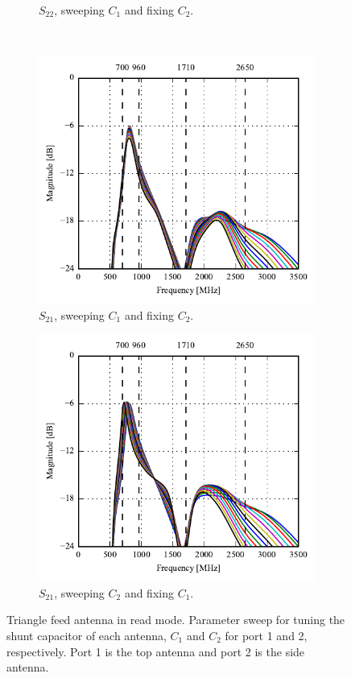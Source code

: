 \begin{figure}[htbp]
\begin{subfigure}[b]{0.49\linewidth}
        \caption{$S_{22}$, sweeping $C_1$ and fixing $C_2$.}
    \end{subfigure}
    \\
    \begin{subfigure}[b]{0.49\linewidth}
        \centering
        \includegraphics{img/tech_sol/trianglefeed/read_mode/Csh1s21.pdf}
        \caption{$S_{21}$, sweeping $C_1$ and fixing $C_2$.}
    \end{subfigure}
    \hfill
    \begin{subfigure}[b]{0.49\linewidth}
        \centering
        \includegraphics{img/tech_sol/trianglefeed/read_mode/Csh2s21.pdf}
        \caption{$S_{21}$, sweeping $C_2$ and fixing $C_1$.}
    \end{subfigure}
    \caption{Triangle feed antenna in read mode. Parameter sweep for tuning the shunt capacitor of each antenna, $C_1$ and $C_2$ for port 1 and 2, respectively. Port 1 is the top antenna and port 2 is the side antenna.}
    \label{fig:tiang_sparam_sweep_read}
\end{figure}

